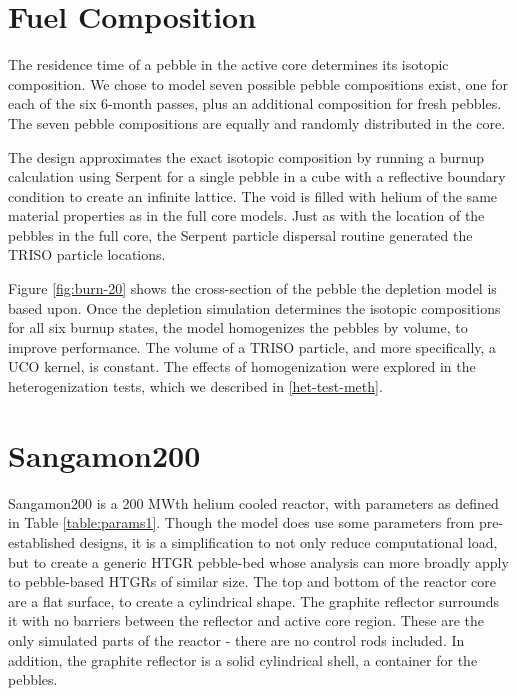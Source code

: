 

\section{Fuel Composition}

The residence time of a pebble in the active core determines its isotopic composition.  We chose to model seven possible pebble compositions exist, one for each of the six 6-month passes, plus an additional composition for fresh pebbles.  The seven pebble compositions are equally and randomly distributed in the core.

The design approximates the exact isotopic composition by running a burnup calculation using Serpent for a single pebble in a cube with a reflective boundary condition to create an infinite lattice.  The void is filled with helium of the same material properties as in the full core models.  Just as with the location of the pebbles in the full core, the Serpent particle dispersal routine generated the TRISO particle locations.



Figure \ref{fig:burn-20} shows the cross-section of the pebble the depletion model is based upon.  Once the depletion simulation determines the isotopic compositions for all six burnup states, the model homogenizes the pebbles by volume, to improve performance.  The volume of a TRISO particle, and more specifically, a UCO kernel, is constant.  The effects of homogenization were explored in the heterogenization tests, which we described in \autoref{het-test-meth}.

\section{Sangamon200}
Sangamon200 is a 200 MWth helium cooled reactor, with parameters as defined in Table \ref{table:params1}.  Though the model does use some parameters from pre-established designs, it is a simplification to not only reduce computational load, but to create a generic HTGR pebble-bed whose analysis can more broadly apply to pebble-based HTGRs of similar size.  The top and bottom of the reactor core are a flat surface, to create a cylindrical shape.  The graphite reflector surrounds it with no barriers between the reflector and active core region. These are the only simulated parts of the reactor - there are no control rods included.  In addition, the graphite reflector is a solid cylindrical shell, a container for the pebbles.

